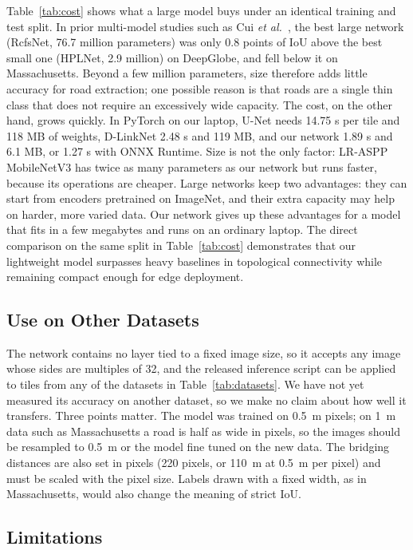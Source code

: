 \documentclass{ieeeaccess}
\begin{document}
Table~\ref{tab:cost} shows what a large model buys under an identical training and test split. In prior multi-model studies such as Cui \emph{et al.}~\cite{cui2025hplnet}, the best large network (RcfsNet, 76.7 million parameters) was only 0.8 points of IoU above the best small one (HPLNet, 2.9 million) on DeepGlobe, and fell below it on Massachusetts. Beyond a few million parameters, size therefore adds little accuracy for road extraction; one possible reason is that roads are a single thin class that does not require an excessively wide capacity. The cost, on the other hand, grows quickly. In PyTorch on our laptop, U-Net needs 14.75 s per tile and 118 MB of weights, D-LinkNet 2.48 s and 119 MB, and our network 1.89 s and 6.1 MB, or 1.27 s with ONNX Runtime. Size is not the only factor: LR-ASPP MobileNetV3 has twice as many parameters as our network but runs faster, because its operations are cheaper. Large networks keep two advantages: they can start from encoders pretrained on ImageNet, and their extra capacity may help on harder, more varied data. Our network gives up these advantages for a model that fits in a few megabytes and runs on an ordinary laptop. The direct comparison on the same split in Table~\ref{tab:cost} demonstrates that our lightweight model surpasses heavy baselines in topological connectivity while remaining compact enough for edge deployment.

\subsection{Use on Other Datasets}

The network contains no layer tied to a fixed image size, so it accepts any image whose sides are multiples of 32, and the released inference script can be applied to tiles from any of the datasets in Table~\ref{tab:datasets}. We have not yet measured its accuracy on another dataset, so we make no claim about how well it transfers. Three points matter. The model was trained on 0.5~m pixels; on 1~m data such as Massachusetts a road is half as wide in pixels, so the images should be resampled to 0.5~m or the model fine tuned on the new data. The bridging distances are also set in pixels (220 pixels, or 110~m at 0.5~m per pixel) and must be scaled with the pixel size. Labels drawn with a fixed width, as in Massachusetts, would also change the meaning of strict IoU.

\subsection{Limitations}
\end{document}

